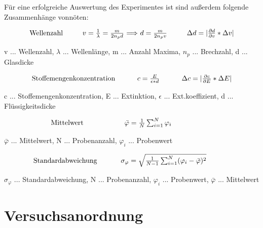 \documentclass[12pt,a4paper,twoside]{article}
\begin{document}
Für eine erfolgreiche Auswertung des Experimentes ist sind außerdem folgende Zusammenhänge vonnöten:

\begin{equation}
    \label{eq:Wellenzahl}
    \centerline{Wellenzahl \\ $v=\frac{1}{\lambda}=\frac{m}{2n_{p}d}$ $\Longrightarrow$ $d=\frac{m}{2n_{p}v}$ \\ $\Delta d = \vert \frac{\partial d}{\partial v} * \Delta v \vert$}
\end{equation}

\noindent
v ... Wellenzahl, $\lambda$ ... Wellenlänge, m ... Anzahl Maxima, $n_{p}$ ... Brechzahl, d ... Glasdicke


\begin{equation}
    \label{eq:Stoffemengenkonzentration}
    \centerline{Stoffemengenkonzentration \\ $c = \frac{E}{\epsilon * d}$ \\ $\Delta c = \vert \frac{\partial c}{\partial E} * \Delta E \vert$}
\end{equation}

\noindent
c ... Stoffemengenkonzentration, E ... Extinktion, $\epsilon$ ... Ext.koeffizient, d ... Flüssigkeitsdicke


\begin{equation}
    \label{eq:Mittelwert}
    \centerline{Mittelwert \\ $\bar{\varphi} = \frac{1}{N} \sum_{i = 1}^{N} \varphi_i $ \\}
\end{equation}

\noindent
$\bar{\varphi}$ ... Mittelwert, N ... Probenanzahl, $\varphi_i$ ... Probenwert


\begin{equation}
    \label{eq:Standardabweichung}
    \centerline{Standardabweichung \\ $\sigma_{\varphi} = \sqrt{\frac{1}{N-1} \sum_{i = 1}^{N} (\varphi_i - \bar{\varphi})^2}$ \\}
\end{equation}

\noindent
$\sigma_{\varphi}$ ... Standardabweichung, N ... Probenanzahl, $\varphi_i$ ... Probenwert, $\bar{\varphi}$ ... Mittelwert

    

\section{Versuchsanordnung} %
\end{document}
